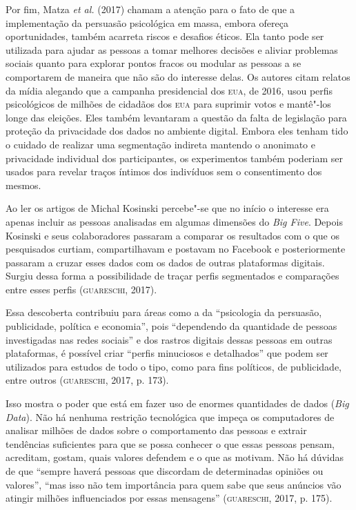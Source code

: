 Por fim, Matza \emph{et al.} (2017) chamam a atenção para o fato de que a
implementação da persuasão psicológica em massa, embora ofereça
oportunidades, também acarreta riscos e desafios éticos. Ela tanto pode
ser utilizada para ajudar as pessoas a tomar melhores decisões e aliviar
problemas sociais quanto para explorar pontos fracos ou modular as
pessoas a se comportarem de maneira que não são do interesse delas. Os
autores citam relatos da mídia alegando que a campanha presidencial dos
\textsc{eua}, de 2016, usou perfis psicológicos de milhões de cidadãos dos \textsc{eua}
para suprimir votos e mantê"-los longe das eleições. Eles também
levantaram a questão da falta de legislação para proteção da privacidade
dos dados no ambiente digital. Embora eles tenham tido o cuidado de
realizar uma segmentação indireta mantendo o anonimato e privacidade
individual dos participantes, os experimentos também poderiam ser usados
para revelar traços íntimos dos indivíduos sem o consentimento dos
mesmos.

Ao ler os artigos de Michal Kosinski percebe"-se que no início o
interesse era apenas incluir as pessoas analisadas em algumas dimensões
do \emph{Big Five}. Depois Kosinski e seus colaboradores passaram a
comparar os resultados com o que os pesquisados curtiam, compartilhavam
e postavam no Facebook e posteriormente passaram a cruzar esses dados
com os dados de outras plataformas digitais. Surgiu dessa forma a
possibilidade de traçar perfis segmentados e comparações entre esses
perfis (\textsc{guareschi}, 2017).

Essa descoberta contribuiu para áreas como a da ``psicologia da
persuasão, publicidade, política e economia'', pois ``dependendo da
quantidade de pessoas investigadas nas redes sociais'' e dos rastros
digitais dessas pessoas em outras plataformas, é possível criar ``perfis
minuciosos e detalhados'' que podem ser utilizados para estudos de todo
o tipo, como para fins políticos, de publicidade, entre outros
(\textsc{guareschi}, 2017, p. 173).

Isso mostra o poder que está em fazer uso de enormes quantidades de
dados (\emph{Big Data}). Não há nenhuma restrição tecnológica que impeça
os computadores de analisar milhões de dados sobre o comportamento das
pessoas e extrair tendências suficientes para que se possa conhecer o
que essas pessoas pensam, acreditam, gostam, quais valores defendem e o que as motivam. Não há dúvidas de que ``sempre haverá pessoas que discordam de determinadas opiniões ou valores'', ``mas isso não tem
importância para quem sabe que seus anúncios vão atingir milhões
influenciados por essas mensagens'' (\textsc{guareschi}, 2017, p. 175).

